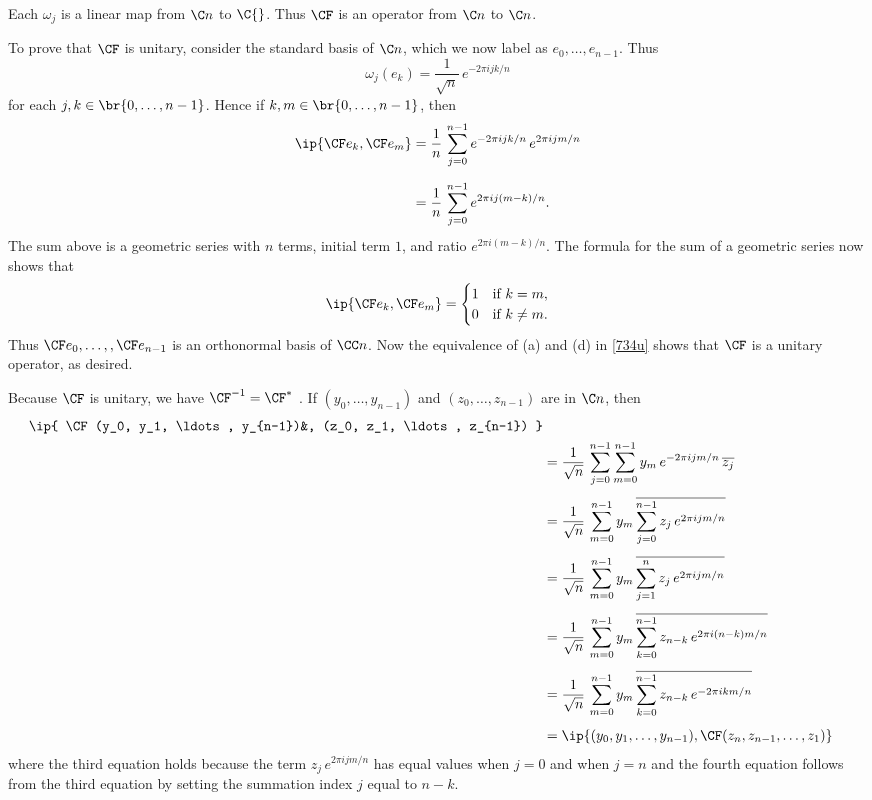 \begin{Solution}
\begin{subtheorem}
\item
Each $\omega_j$ is a linear map from $\C n$ to $\C{}$. Thus $\CF$ is an operator from $\C n$ to $\C n$.

To prove that $\CF$ is unitary, consider the standard basis of $\C n$, which we now label as $e_0, \ldots, e_{n-1}$. Thus
\[
\omega_j(e_k) = \frac{1}{\sqrt{n}} \, e^{-2\pi i j k/n}
\]
for each $j, k \in \br{0, \ldots, n-1}$. Hence if $k, m \in \br{0, \ldots, n-1}$, then
\begin{align*}
\ip{ \CF e_k, \CF e_m } &= \frac{1}{n} \, \sum_{j=0}^{n-1}  e^{-2\pi i j k/n}  \, e^{2\pi i j m/n} \\[6bp]
&= \frac{1}{n} \, \sum_{j=0}^{n-1}  e^{2\pi i j (m-k)/n}.
\end{align*}
The sum above is a geometric series with $n$ terms, initial term $1$, and ratio $e^{2\pi i (m-k)/n}$. The formula for the sum of a geometric series now shows that
\[
\ip{ \CF e_k, \CF e_m } = \begin{cases}
1 & \text{if } k = m,\\
0 & \text{if } k \ne m.
\end{cases}
\]
Thus $\CF e_0, \ldots,, \CF e_{n-1}$ is an orthonormal basis of $\CC n$. Now the equivalence of (a) and (d) in \ref{734u} shows that $\CF$ is a unitary operator, as desired.

\item
Because $\CF$ is unitary, we have $\CF^{-1} = \CF^*$ . If $(y_0, \ldots, y_{n-1})$ and
$(z_0, \ldots, z_{n-1})$ are in $\C n$, then
\begin{align*}
\ip{ \CF(y_0, y_1, \ldots, y_{n-1})&, (z_0, z_1, \ldots, z_{n-1}) } \\
&= \frac{1}{\sqrt{n}} \, \sum_{j=0}^{n-1} \sum_{m=0}^{n-1} y_m \,  e^{-2\pi i j m/n} \, \overline{z_j} \\[4bp]
&= \frac{1}{\sqrt{n}} \, \sum_{m=0}^{n-1} y_m \, \overline{ \sum_{j=0}^{n-1} z_j \, e^{2\pi i jm/n} } \\[4bp]
&= \frac{1}{\sqrt{n}} \, \sum_{m=0}^{n-1} y_m \, \overline{ \sum_{j=1}^n z_j \, e^{2\pi i jm/n} } \\[4bp]
&= \frac{1}{\sqrt{n}} \, \sum_{m=0}^{n-1} y_m \, \overline{ \sum_{k=0}^{n-1} z_{n-k} \, e^{2\pi i (n-k)m/n} } \\[4bp]
&= \frac{1}{\sqrt{n}} \, \sum_{m=0}^{n-1} y_m \, \overline{ \sum_{k=0}^{n-1} z_{n-k} \, e^{-2\pi i k m/n} } \\[4bp]
&= \ip{ (y_0, y_1, \ldots, y_{n-1}), \CF(z_n, z_{n-1}, \ldots, z_1) }
\end{align*}
where the third equation holds because the term $ z_j \, e^{2\pi i jm/n}$ has equal values when $j = 0$ and when $j=n$ and the fourth equation follows from the third equation by setting the summation index $j$ equal to $n - k$.


\end{subtheorem}
\end{Solution}
